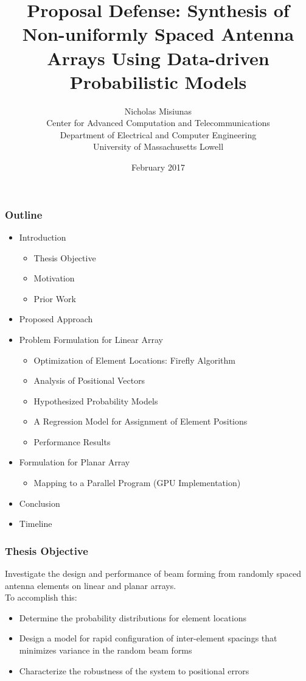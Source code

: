 \documentclass[...]{beamer}
\title{Proposal Defense: Synthesis of Non-uniformly Spaced Antenna Arrays Using Data-driven Probabilistic Models}
\author{Nicholas Misiunas\\
Center for Advanced Computation and Telecommunications\\
Department of Electrical and Computer Engineering\\
University of Massachusetts Lowell}
\date{February 2017}
\begin{document}
\begin{frame}
\titlepage
\end{frame}


\begin{frame}
  \frametitle{Outline}
  \begin{itemize}
    \item Introduction
      \begin{itemize}
        \item Thesis Objective
        \item Motivation
        \item Prior Work
      \end{itemize}
    \item Proposed Approach
    \item Problem Formulation for Linear Array
      \begin{itemize}
        \item Optimization of Element Locations: Firefly Algorithm
        \item Analysis of Positional Vectors
        \item Hypothesized Probability Models
        \item A Regression Model for Assignment of Element Positions
        \item Performance Results
      \end{itemize}
    \item Formulation for Planar Array
      \begin{itemize}
        \item Mapping to a Parallel Program (GPU Implementation)
      \end{itemize}
    \item Conclusion
    \item Timeline
  \end{itemize}
\end{frame}


\begin{frame}
  \frametitle{Thesis Objective}

  Investigate the design and performance of beam forming from randomly spaced antenna elements on linear and planar arrays.\\
  \vspace{3mm}
  To accomplish this:
  \begin{itemize}
    \item Determine the probability distributions for element locations
    \item Design a model for rapid configuration of inter-element spacings that minimizes variance in the random beam forms
    \item Characterize the robustness of the system to positional errors
  \end{itemize}

\end{frame}
\end{document}

